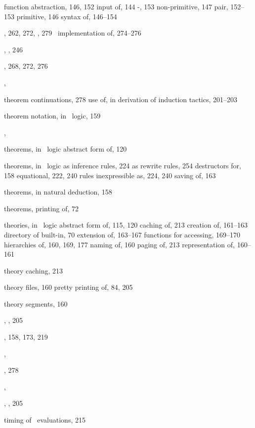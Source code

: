\begin{theindex}
    \subitem function abstraction, 146, 152
    \subitem input of, 144
    \subitem {}-, 153
    \subitem non-primitive, 147
    \subitem pair, 152--153
    \subitem primitive, 146
    \subitem syntax of, 146--154
  \item {}, 262, 272, , 279
    \subitem \ML\ implementation of, 274--276
  \item {}, , 246
  \item {}, 268, 272, 276
  \item {}, 
  \item theorem continuations, 278
    \subitem use of, in derivation of induction tactics, 201--203
  \item theorem notation, in \HOL\ logic, 159
  \item {}, 
  \item theorems, in \HOL\ logic
    \subitem abstract form of, 120
  \item theorems, in \HOL\ logic
    \subitem as inference rules, 224
    \subitem as rewrite rules, 254
    \subitem destructors for, 158
    \subitem equational, 222, 240
    \subitem rules inexpressible as, 224, 240
    \subitem saving of, 163
  \item theorems, in natural deduction, 158
  \item theorems, printing of, 72
  \item theories, in \HOL\ logic
    \subitem abstract form of, 115, 120
    \subitem caching of, 213
    \subitem creation of, 161--163
    \subitem directory of built-in, 70
    \subitem extension of, 163--167
    \subitem functions for accessing, 169--170
    \subitem hierarchies of, 160, 169, 177
    \subitem naming of, 160
    \subitem paging of, 213
    \subitem representation of, 160--161
  \item theory caching, 213
  \item theory files, 160
    \subitem pretty printing of, 84, 205
  \item theory segments, 160
  \item {}, , 205
  \item {}, 158, 173, 219
  \item {}, 
  \item {}, 278
  \item {}, 
  \item {}, , 205
  \item timing of \HOL\ evaluations, 215

\end{theindex}
